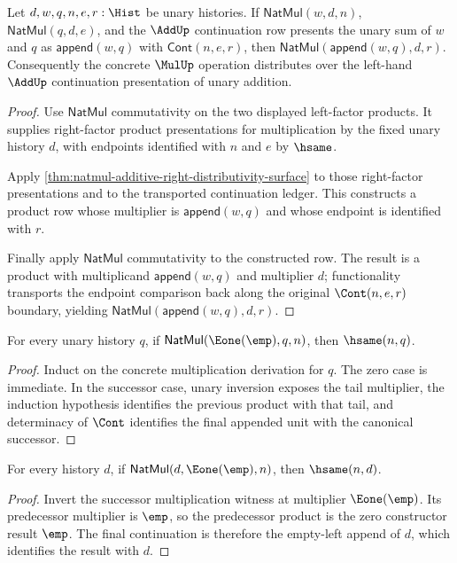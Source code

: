 \begin{theorem}
\label{thm:natmul-additive-left-distributivity-surface}
Let $d,w,q,n,e,r:\Hist$ be unary histories. If $\mathsf{NatMul}(w,d,n)$,
$\mathsf{NatMul}(q,d,e)$, and the $\AddUp$ continuation row presents the
unary sum of $w$ and $q$ as $\mathsf{append}(w,q)$ with $\mathsf{Cont}(n,e,r)$,
then $\mathsf{NatMul}(\mathsf{append}(w,q),d,r)$. Consequently the concrete
$\MulUp$ operation distributes over the left-hand $\AddUp$ continuation
presentation of unary addition.
\end{theorem}
\begin{proof}
Use $\mathsf{NatMul}$ commutativity on the two displayed left-factor products.
It supplies right-factor product presentations for multiplication by the fixed
unary history $d$, with endpoints identified with $n$ and $e$ by $\hsame$.

Apply \autoref{thm:natmul-additive-right-distributivity-surface} to those
right-factor presentations and to the transported continuation ledger. This
constructs a product row whose multiplier is $\mathsf{append}(w,q)$ and whose
endpoint is identified with $r$.

Finally apply $\mathsf{NatMul}$ commutativity to the constructed row. The
result is a product with multiplicand $\mathsf{append}(w,q)$ and multiplier
$d$; functionality transports the endpoint comparison back along the original
$\Cont(n,e,r)$ boundary, yielding $\mathsf{NatMul}(\mathsf{append}(w,q),d,r)$.
\end{proof}

\begin{lemma}
\label{lem:nat-mul-unit-left-hsame}
For every unary history $q$, if $\mathsf{NatMul}(\Eone(\emp), q, n)$, then $\hsame(n,q)$.
\end{lemma}
\begin{proof}
Induct on the concrete multiplication derivation for $q$. The zero case is immediate. In the successor case, unary inversion exposes the tail multiplier, the induction hypothesis identifies the previous product with that tail, and determinacy of $\Cont$ identifies the final appended unit with the canonical successor.
\end{proof}

\begin{lemma}
\label{lem:natmul-unit-right-hsame}
For every history $d$, if $\mathsf{NatMul}(d,\Eone(\emp),n)$, then
$\hsame(n,d)$.
\end{lemma}
\begin{proof}
Invert the successor multiplication witness at multiplier $\Eone(\emp)$. Its
predecessor multiplier is $\emp$, so the predecessor product is the zero
constructor result $\emp$. The final continuation is therefore the empty-left
append of $d$, which identifies the result with $d$.
\end{proof}

